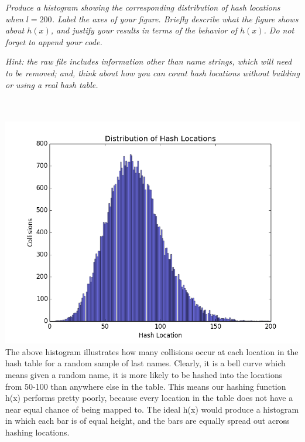 \documentclass[12pt]{article} \setlength{\oddsidemargin}{0in}
\begin{document}
{\begin{enumerate}
{    \textit{Produce a histogram showing the corresponding distribution of hash locations
      when $l = 200$. Label the axes of your figure. Briefly describe what the figure
      shows about $h(x)$, and justify your results in terms of the behavior of $h(x)$. Do
      not forget to append your code.}

    \footnotesize{\textit{Hint: the raw file includes information other than name strings, which will need to be removed; and, think about how you can count hash locations without building or using a real hash table.}}
  }
  \\\\
  \includegraphics[width=15cm,height=10cm]{figure_1}
  The above histogram illustrates how many collisions occur at each location in the hash table for a random sample of last names. Clearly, it is a bell curve which means given a random name, it is more likely to be hashed into the locations from 50-100 than anywhere else in the table. This means our hashing function h(x) performs pretty poorly, because every location in the table does not have a near equal chance of being mapped to. The ideal h(x) would produce a histogram in which each bar is of equal height, and the bars are equally spread out across hashing locations. 

\pagebreak 


\end{enumerate}}
\end{document}
